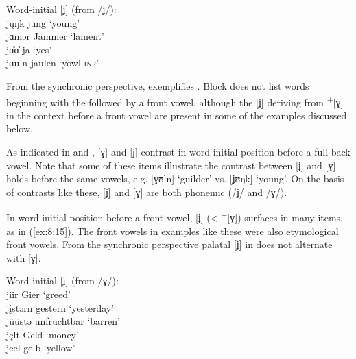 \ea%
\label{ex:8:14}Word-initial [ʝ] (from /ʝ/):\\
j\k{u}ŋk \tab [ʝʊŋk] \tab jung \tab ‘young’ \\
jɑmər \tab [ʝɑmər] \tab Jammer \tab ‘lament’ \\
jɑ̊ɑ̊ \tab  [ʝɑː] \tab ja \tab  ‘yes’ \\
jɑuln \tab [ʝɑuln̩] \tab jaulen \tab ‘yowl\textsc{{}-inf}’ 
\z 

From the synchronic perspective,  exemplifies . Block does not list words beginning with the  followed by a front vowel, although the [ʝ] deriving from  \textsuperscript{+}[ɣ] in the context before a front vowel are present in some of the examples discussed below.

As indicated in  and ,  [ɣ] and [ʝ] contrast in word-initial position before a full back vowel. Note that some of these items illustrate the contrast between [ʝ] and [ɣ] holds before the same vowels, e.g. [ɣʊln] ‘guilder’ vs. [ʝʊŋk] ‘young’.  On the basis of contrasts like these, [ʝ] and [ɣ] are both phonemic (/ʝ/ and /ɣ/).

In word-initial position before a front vowel, [ʝ] (< \textsuperscript{+}[ɣ]) surfaces in many items, as in (\ref{ex:8:15}). The front vowels in examples like these were also etymological front vowels. From the synchronic perspective palatal [ʝ] in  does not alternate with [ɣ].

\ea%
\label{ex:8:15}Word-initial [ʝ] (from /ɣ/):\\
  jiir \tab [ʝiːr] \tab Gier \tab ‘greed’ \\
  j\k{i}stərn \tab [ʝɪstərn] \tab gestern \tab ‘yesterday’ \\
  jüüstə \tab [ʝyːstə] \tab unfruchtbar \tab ‘barren’ \\
  jęlt \tab [ʝɛlt] \tab Geld \tab ‘money’ \\
  jeel \tab [ʝeːl] \tab gelb \tab ‘yellow’ 
\z 

